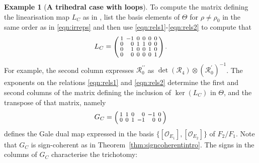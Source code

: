 \documentclass[11pt,reqno]{amsart}
\numberwithin{equation}{section}
\theoremstyle{definition}
\newtheorem{example}[theorem]{Example}
\newcommand{\0}{\operatorname{0}}
\begin{document}
\begin{example}[\textbf{A trihedral case with loops}]
 To compute the matrix defining the linearisation map $L_C$ as in \cite[Definition~6.1]{C21}, list the basis elements of $\Theta$ for $\rho\neq \rho_{0}$ in the same order as in \eqref{eqn:irreps} and then use \eqref{eqn:rels1}-\eqref{eqn:rels2} to compute that 
 \[
\setlength{\arraycolsep}{2pt}
   \renewcommand{\arraystretch}{0.8}
L_C=\mbox{\footnotesize$\left(\begin{array}{crcccc}
1 & -1 & 0 & 0 & 0 & 0  \\
0 & 0 & 1 & 1 & 0 & 0  \\
0 & 1 & 0 & 0 & 1 & 0  \\
0 & 0 & 0 & 0 & 0 & 1    
\end{array}\right).$}
\]
For example, the second column expresses $\mathcal{R}_0^{\prime\prime}$ as $\det(\mathcal{R}_4)\otimes (\mathcal{R}_0^{\prime})^{-1}$. The exponents on the relations \eqref{eqn:rels1} and \eqref{eqn:rels2} determine the first and second columns of the matrix defining the inclusion of $\ker(L_C)$ in $\Theta$, and the transpose of that matrix, namely 
 \begin{equation}
    \label{eqn:Ktbento}
\setlength{\arraycolsep}{2pt}
   \renewcommand{\arraystretch}{0.8}
G_C=\mbox{\footnotesize$\left(\begin{array}{rrcrrc}
1 & 1 &  0 &  0 & -1  & 0 \\
0 & 0 &  1 & -1 & 0  & 0  
\end{array}\right)$}
\end{equation}
 defines the Gale dual map expressed in the basis $\{[\mathcal{O}_{E_1}], [\mathcal{O}_{E_2}]\}$ of $F_2/F_1$. Note that $G_C$ is sign-coherent as in Theorem~\ref{thm:signcoherentintro}. The signs in the columns of $G_C$ characterise the trichotomy:


\end{example}
\end{document}
